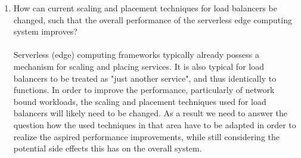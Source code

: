 \begin{enumerate}
    \item How can current scaling and placement techniques for load balancers be changed, such that the overall performance of the serverless edge computing system improves?\\\\
    Serverless (edge) computing frameworks typically already possess a mechanism for scaling and placing services. It is also typical for load balancers to be treated as "just another service", and thus identically to functions. %
    In order to improve the performance, particularly of network bound workloads, the scaling and placement techniques used for load balancers will likely need to be changed. As a result we need to answer the question how the used techniques in that area have to be adapted in order to realize the aspired performance improvements, while still considering the potential side effects this has on the overall system.
    
\end{enumerate}